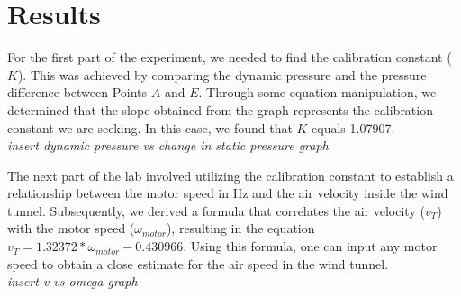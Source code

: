 \chapter{Results}
\label{cp:results}
For the first part of the experiment, we needed to find the calibration constant ($K$). This was achieved by comparing the dynamic pressure and the pressure difference between Points $A$ and $E$. Through some equation manipulation, we determined that the slope obtained from the graph represents the calibration constant we are seeking. In this case, we found that $K$ equals 1.07907. \\
{\it insert dynamic pressure vs change in static pressure graph} \par
The next part of the lab involved utilizing the calibration constant to establish a relationship between the motor speed in Hz and the air velocity inside the wind tunnel. Subsequently, we derived a formula that correlates the air velocity ($v_T$) with the motor speed ($\omega _{motor}$), resulting in the equation $v_T = 1.32372 * \omega _{motor} - 0.430966$. Using this formula, one can input any motor speed to obtain a close estimate for the air speed in the wind tunnel. \\
{\it insert v vs omega graph}